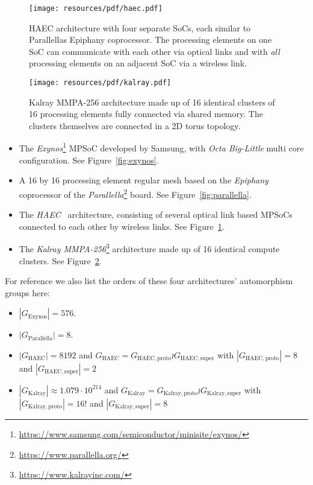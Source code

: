 \begin{figure}
  \centering
    \texttt{[image: resources/pdf/haec.pdf]}
  \caption{HAEC architecture with four separate SoCs, each similar to
           Parallellas Epiphany coprocessor. The processing elements on one
           SoC can communicate with each other via optical links and with
           \textit{all} processing elements on an adjacent SoC via a wireless
           link.}
  \label{fig:haec}
\end{figure}

\begin{figure}
  \centering
    \texttt{[image: resources/pdf/kalray.pdf]}
  \caption{Kalray MMPA-256 architecture made up of 16 identical clusters of 16
           processing elements fully connected via shared memory. The clusters
           themselves are connected in a 2D torus topology.}
  \label{fig:kalray}
\end{figure}

\begin{itemize}
\item The
\textit{Exynos}\footnote{\hyperlink{https://www.samsung.com/semiconductor/minisite/exynos/}{https://www.samsung.com/semiconductor/minisite/exynos/}}
MPSoC developed by Samsung, with \textit{Octa Big-Little} multi core
configuration. See Figure~\ref{fig:exynos}.

\item A 16 by 16 processing element regular mesh based on the
\textit{Epiphany} \cite{Olofsson16} coprocessor of the
\textit{Parallella}\footnote{\hyperlink{https://www.parallella.org/}{https://www.parallella.org/}}
board. See Figure~\ref{fig:parallella}.

\item The \textit{HAEC}~\cite{HAEC} architecture, consisting of several optical
link based MPSoCs connected to each other by wireless links. See
Figure~\ref{fig:haec}.

\item The \textit{Kalray
MMPA-256}\footnote{\hyperlink{https://www.kalrayinc.com/}{https://www.kalrayinc.com/}}
architecture made up of 16 identical compute clusters. See
Figure~\ref{fig:kalray}.
\end{itemize}
%
For reference we also list the orders of these four architectures' automorphism
groups here:
%
\begin{itemize}
\item $|G_{\mathrm{Exynos}}| = 576$.

\item $|G_{\mathrm{Parallella}}| = 8$.

\item $|G_{\mathrm{HAEC}}| = 8192$ and $G_{\mathrm{HAEC}} =
G_{\mathrm{HAEC,proto}} \wr G_{\mathrm{HAEC,super}}$ with
$|G_{\mathrm{HAEC,proto}}| = 8$ and $|G_{\mathrm{HAEC,super}}| = 2$

\item $|G_{\mathrm{Kalray}}| \approx 1.079 \cdot 10^{214}$ and
$G_{\mathrm{Kalray}} = G_{\mathrm{Kalray,proto}} \wr G_{\mathrm{Kalray,super}}$
with $|G_{\mathrm{Kalray,proto}}| = 16!$ and $|G_{\mathrm{Kalray,super}}| = 8$
\end{itemize}

